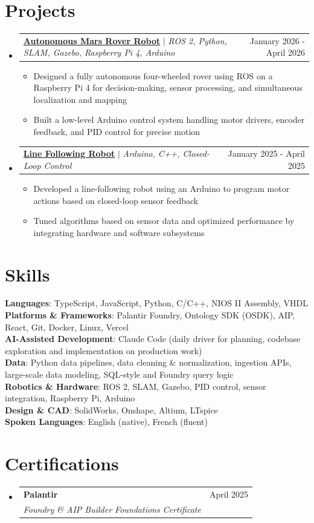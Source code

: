 \documentclass[letterpaper,11pt]{article}
\makeatletter
\newcommand{\resumeItem}[1]{
  \item\small{
    {#1 \vspace{-2pt}}
  }
}
\newcommand{\resumeSubheading}[4]{
  \vspace{-2pt}\item
    \begin{tabular*}{0.97\textwidth}[t]{l@{\extracolsep{\fill}}r}
      \textbf{#1} & #2 \\
      \textit{\small#3} & \textit{\small #4} \\
    \end{tabular*}\vspace{-7pt}
}
\newcommand{\resumeProjectHeading}[2]{
    \item
    \begin{tabular*}{0.97\textwidth}{l@{\extracolsep{\fill}}r}
      \small#1 & #2 \\
    \end{tabular*}\vspace{-7pt}
}
\newcommand{\resumeSubHeadingListStart}{\begin{itemize}[leftmargin=0.15in, label={}]}
\newcommand{\resumeSubHeadingListEnd}{\end{itemize}}
\newcommand{\resumeItemListStart}{\begin{itemize}}
\newcommand{\resumeItemListEnd}{\end{itemize}\vspace{-5pt}}
\makeatother
\begin{document}
\section{Projects}
    \resumeSubHeadingListStart
      \resumeProjectHeading
          {\textbf{\href{https://github.com/MREN203-Team-11/203ros_ws}{Autonomous Mars Rover Robot}} $|$ \emph{ROS 2, Python, SLAM, Gazebo, Raspberry Pi 4, Arduino}}{January 2026 - April 2026}
          \resumeItemListStart
            \resumeItem{Designed a fully autonomous four-wheeled rover using ROS on a Raspberry Pi 4 for decision-making, sensor processing, and simultaneous localization and mapping}
            \resumeItem{Built a low-level Arduino control system handling motor drivers, encoder feedback, and PID control for precise motion}
          \resumeItemListEnd
      \resumeProjectHeading
          {\textbf{\href{https://github.com/LiamShandog/Line-Following-Bot}{Line Following Robot}} $|$ \emph{Arduino, C++, Closed-Loop Control}}{January 2025 - April 2025}
          \resumeItemListStart
            \resumeItem{Developed a line-following robot using an Arduino to program motor actions based on closed-loop sensor feedback}
            \resumeItem{Tuned algorithms based on sensor data and optimized performance by integrating hardware and software subsystems}
          \resumeItemListEnd
    \resumeSubHeadingListEnd

\section{Skills}
 \begin{itemize}[leftmargin=0.15in, label={}]
    \small{\item{
     \textbf{Languages}{: TypeScript, JavaScript, Python, C/C++, NIOS II Assembly, VHDL} \\
     \textbf{Platforms \& Frameworks}{: Palantir Foundry, Ontology SDK (OSDK), AIP, React, Git, Docker, Linux, Vercel} \\
     \textbf{AI-Assisted Development}{: Claude Code (daily driver for planning, codebase exploration and implementation on production work)} \\
     \textbf{Data}{: Python data pipelines, data cleaning \& normalization, ingestion APIs, large-scale data modeling, SQL-style and Foundry query logic} \\
     \textbf{Robotics \& Hardware}{: ROS 2, SLAM, Gazebo, PID control, sensor integration, Raspberry Pi, Arduino} \\
     \textbf{Design \& CAD}{: SolidWorks, Onshape, Altium, LTspice} \\
     \textbf{Spoken Languages}{: English (native), French (fluent)}
    }}
 \end{itemize}

\section{Certifications}
  \resumeSubHeadingListStart
    \resumeSubheading
      {Palantir}{April 2025}
      {Foundry \& AIP Builder Foundations Certificate}{}
  \resumeSubHeadingListEnd

\end{document}
